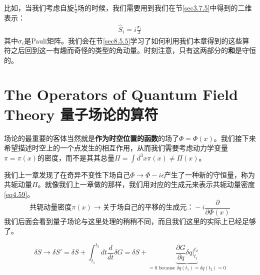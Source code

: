 比如，当我们考虑自旋$\tfrac{1}{2}$场的时候，我们需要用到我们在节\ref{sec3.7.5}中得到的二维表示：
\begin{align}
\hat{S}_i = i\frac{\sigma_i}{2}
\end{align}
其中$\sigma_i$是Pauli矩阵。我们会在节\ref{sec8.5.5}学习了如何利用我们本章得到的这些算符之后回到这一有趣而奇怪的类型的角动量。时刻注意，只有这两部分的{\bf 和}是守恒的。

\section[量子场论的算符]{The Operators of Quantum Field Theory 量子场论的算符}\label{sec5.2}

场论的最重要的客体当然就是{\bf 作为时空位置的函数}的场了$\Phi = \Phi(x)$。我们接下来希望描述时空上的一个点发生的相互作用，从而我们需要考虑动力学变量$\pi = \pi(x)$的密度，而不是其其总量$\Pi = \int d^3x\pi(x)\neq\Pi(x)$。

我们上一章发现了在奇异不变性下场自己$\Phi\to\Phi-i\epsilon$产生了一种新的守恒量，称为共轭动量$\Pi$。就像我们上一章做的那样，我们用对应的生成元来表示共轭动量密度\eqref{eq4.59}。
\[\text{共轭动量密度}\pi(x)\to\text{关于场自己的平移的生成元：}-i\frac{\partial}{\partial\Phi(x)} \]
我们后面会看到量子场论与这里处理的稍稍不同，而且我们这里的实际上已经足够了。

\[\delta S\to\delta S' = \delta S+\int_{t_1}^{t_2}dt\frac{d}{dt}\delta G = \delta S+ \!\!\!\!\!\!\!\!\!\!\!\!\!\!\!\! \underbrace{\frac{\partial G}{\partial q}\delta q|_{t_1}^{t_2}}_{=0\text{ because }\delta q(t_1)=\delta q(t_2)=0} \]

